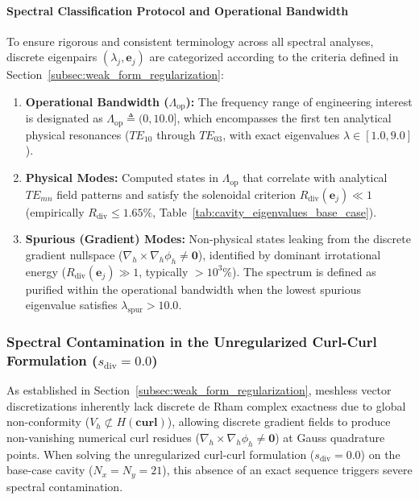 \documentclass[preprint,12pt]{elsarticle}
\begin{document}
\paragraph{Spectral Classification Protocol and Operational Bandwidth}
To ensure rigorous and consistent terminology across all spectral analyses, discrete eigenpairs $(\lambda_j, \mathbf{e}_j)$ are categorized according to the criteria defined in Section~\ref{subsec:weak_form_regularization}:
\begin{enumerate}
    \item \textbf{Operational Bandwidth ($\Lambda_{\mathrm{op}}$):} The frequency range of engineering interest is designated as $\Lambda_{\mathrm{op}} \triangleq (0, 10.0]$, which encompasses the first ten analytical physical resonances ($TE_{10}$ through $TE_{03}$, with exact eigenvalues $\lambda \in [1.0, 9.0]$).
    \item \textbf{Physical Modes:} Computed states in $\Lambda_{\mathrm{op}}$ that correlate with analytical $TE_{mn}$ field patterns and satisfy the solenoidal criterion $R_{\mathrm{div}}(\mathbf{e}_j) \ll 1$ (empirically $R_{\mathrm{div}} \le 1.65\%$, Table~\ref{tab:cavity_eigenvalues_base_case}).
    \item \textbf{Spurious (Gradient) Modes:} Non-physical states leaking from the discrete gradient nullspace ($\nabla_h \times \nabla_h \phi_h \neq \mathbf{0}$), identified by dominant irrotational energy ($R_{\mathrm{div}}(\mathbf{e}_j) \gg 1$, typically $> 10^3\%$). The spectrum is defined as purified within the operational bandwidth when the lowest spurious eigenvalue satisfies $\lambda_{\mathrm{spur}} > 10.0$.
\end{enumerate}

\subsubsection{Spectral Contamination in the Unregularized Curl-Curl Formulation (\texorpdfstring{$s_{\mathrm{div}} = 0.0$}{s(div) = 0.0})}
\label{subsubsec:unregularized_formulation}

As established in Section~\ref{subsec:weak_form_regularization}, meshless vector discretizations inherently lack discrete de Rham complex exactness due to global non-conformity ($V_h \not\subset H(\mathbf{curl})$), allowing discrete gradient fields to produce non-vanishing numerical curl residues ($\nabla_h \times \nabla_h \phi_h \neq \mathbf{0}$) at Gauss quadrature points. When solving the unregularized curl-curl formulation ($s_{\mathrm{div}} = 0.0$) on the base-case cavity ($N_x = N_y = 21$), this absence of an exact sequence triggers severe spectral contamination.
\end{document}
